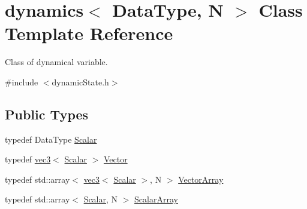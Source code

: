 \hypertarget{classdynamics}{}\section{dynamics$<$ Data\+Type, N $>$ Class Template Reference}
\label{classdynamics}


Class of dynamical variable.  




{\ttfamily \#include $<$dynamic\+State.\+h$>$}

\subsection*{Public Types}
\begin{DoxyCompactItemize}
\item 
typedef Data\+Type \mbox{\hyperlink{classdynamics_a444c7534e86115117798563cb0e43cde}{Scalar}}
\item 
typedef \mbox{\hyperlink{structvec3}{vec3}}$<$ \mbox{\hyperlink{classdynamics_a444c7534e86115117798563cb0e43cde}{Scalar}} $>$ \mbox{\hyperlink{classdynamics_a9ba7c016128ac3a2eb51f7bcfbf90243}{Vector}}
\item 
typedef std\+::array$<$ \mbox{\hyperlink{structvec3}{vec3}}$<$ \mbox{\hyperlink{classdynamics_a444c7534e86115117798563cb0e43cde}{Scalar}} $>$, N $>$ \mbox{\hyperlink{classdynamics_a41e25703d6668a66d96a1db3dc5df03b}{Vector\+Array}}
\item 
typedef std\+::array$<$ \mbox{\hyperlink{classdynamics_a444c7534e86115117798563cb0e43cde}{Scalar}}, N $>$ \mbox{\hyperlink{classdynamics_ac31f831ea1577092662dafd2daba0f48}{Scalar\+Array}}
\end{DoxyCompactItemize}
